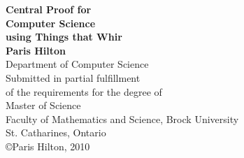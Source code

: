 \begin{titlepage}
\begin{center}

{\LARGE {\bf Central Proof for}}
\\[0.2cm]{\LARGE {\bf Computer Science}}
\\[0.2cm]{\LARGE {\bf using Things that Whir}}
\\[3cm]
{\Large{ \bf Paris Hilton}}
\\[0.5cm]
{\large Department of Computer Science}
\\[3cm]
{\large Submitted in partial fulfillment\\
of the requirements for the degree of}
\\[1cm]
{\large Master of Science}
\\[1cm]
{\large Faculty of Mathematics and Science, Brock University\\
St. Catharines, Ontario}
\\[4cm]
\copyright Paris Hilton, 2010

\end{center}
\end{titlepage}

